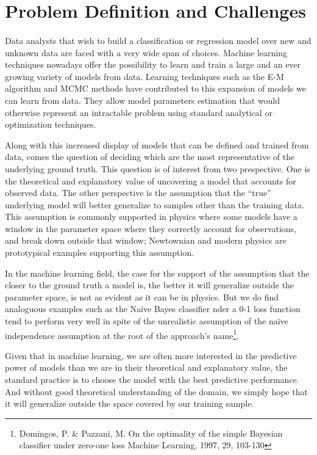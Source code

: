 \label{sec:Introduction} 

\section{Problem Definition and Challenges}
\paragraph{}

Data analysts that wish to build a classification or regression model over new and unknown data are faced with a very wide span of choices.  Machine learning techniques nowadays offer the possibility to learn and train a large and an ever growing variety of models from data.  Learning techniques such as the E-M algorithm and MCMC methods have contributed to this expansion of models we can learn from data.  They allow model parameters estimation that would otherwise represent an intractable problem using standard analytical or optimization techniques.

Along with this increased display of models that can be defined and trained from data, comes the question of deciding which are the most representative of the underlying ground truth.  This question is of interest from two prespective.  One is the theoretical and explanatory value of uncovering a model that accounts for observed data.  The other perspective is the assumption that the ``true'' underlying model will better generalize to samples other than the training data.  This assumption is commonly supported in physics where some models have a window in the parameter space where they correctly account for observations, and break down outside that window; Newtownian and modern physics are prototypical examples supporting this assumption.  

In the machine learning field, the case for the support of the assumption that the closer to the ground truth a model is, the better it will generalize outside the parameter space, is not as evident as it can be in physics. But we do find analoguous examples such as the Naïve Bayes classifier nder a 0-1 loss function tend to perform very well in spite of the unrealistic assumption of the naïve independence assumption at the root of the approach's name\footnote{Domingos, P. & Pazzani, M. On the optimality of the simple Bayesian classifier under zero-one loss Machine Learning, 1997, 29, 103-130}.

Given that in machine learning, we are often more interested in the predictive power of models than we are in their theoretical and explanatory value, the standard practice is to choose the model with the best predictive performance.  And without good theoretical understanding of the domain, we simply hope that it will generalize outside the space covered by our training sample.  

